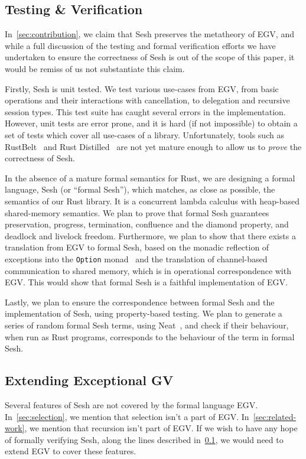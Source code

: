 \documentclass[copyright,creativecommons]{eptcs}
\begin{document}
\subsection{Testing \& Verification}\label{sec:verification}
In~\cref{sec:contribution}, we claim that Sesh preserves the metatheory of EGV, and while a full discussion of the testing and formal verification efforts we have undertaken to ensure the correctness of Sesh is out of the scope of this paper, it would be remiss of us not substantiate this claim.

Firstly, Sesh is unit tested. We test various use-cases from EGV, from basic operations and their interactions with cancellation, to delegation and recursive session types. This test suite has caught several errors in the implementation. However, unit tests are error prone, and it is hard (if not impossible) to obtain a set of tests which cover all use-cases of a library. Unfortunately, tools such as RustBelt~\cite{jung2017} and Rust Distilled~\cite{weiss2018} are not yet mature enough to allow us to \emph{prove} the correctness of Sesh.

In the absence of a mature formal semantics for Rust, we are designing a formal language, Sesh (or ``formal Sesh''), which matches, as close as possible, the semantics of our Rust library. It is a concurrent lambda calculus with heap-based shared-memory semantics. We plan to prove that formal Sesh guarantees preservation, progress, termination, confluence and the diamond property, and deadlock and livelock freedom. Furthermore, we plan to show that there exists a translation from EGV to formal Sesh, based on the monadic reflection of exceptions into the \lstinline{Option} monad~\cite{filinski1994} and the translation of channel-based communication to shared memory, which is in operational correspondence with EGV. This would show that formal Sesh is a faithful implementation of EGV.

Lastly, we plan to ensure the correspondence between formal Sesh and the implementation of Sesh, using property-based testing. We plan to generate a series of random formal Sesh terms, using Neat~\cite{claessen2015}, and check if their behaviour, when run as Rust programs, corresponds to the behaviour of the term in formal Sesh.

\subsection{Extending Exceptional GV}
Several features of Sesh are not covered by the formal language EGV. In~\cref{sec:selection}, we mention that selection isn't a part of EGV. In~\cref{sec:related-work}, we mention that recursion isn't part of EGV. If we wish to have any hope of formally verifying Sesh, along the lines described in~\cref{sec:verification}, we would need to extend EGV to cover these features.



\end{document}
